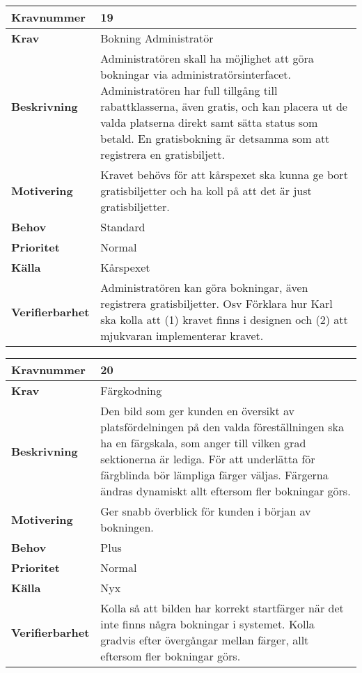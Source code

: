 \documentclass[a4paper, twoside, 11pt, titlepage]{article}
\begin{document}
\begin{tabular} { | p{3cm} | p{12.2cm} | }
	\hline
	\textbf{Kravnummer} & 19  \\
	\hline
	\textbf{Krav} & Bokning Administratör  \\
	\hline
	\textbf{Beskrivning} & Administratören skall ha möjlighet att göra bokningar via administratörsinterfacet. Administratören har full tillgång till rabattklasserna, även gratis, och kan placera ut de valda platserna direkt samt sätta status som betald. En gratisbokning är detsamma som att registrera en gratisbiljett.  \\
	\hline
	\textbf{Motivering} & Kravet behövs för att kårspexet ska kunna ge bort gratisbiljetter och ha koll på att det är just gratisbiljetter.  \\
	\hline
	\textbf{Behov} & Standard  \\
	\hline
	\textbf{Prioritet} & Normal  \\
	\hline
	\textbf{Källa} & Kårspexet  \\
	\hline
	\textbf{Verifierbarhet} & Administratören kan göra bokningar, även registrera gratisbiljetter. Osv Förklara hur Karl ska kolla att (1) kravet finns i designen och (2) att mjukvaran implementerar kravet.  \\
	\hline
\end{tabular}

\begin{tabular} { | p{3cm} | p{12.2cm} | }
	\hline
	\textbf{Kravnummer} & 20  \\
	\hline
	\textbf{Krav} & Färgkodning  \\
	\hline
	\textbf{Beskrivning} & Den bild som ger kunden en översikt av platsfördelningen på den valda föreställningen ska ha en färgskala, som anger till vilken grad sektionerna är lediga. För att underlätta för färgblinda bör lämpliga färger väljas. Färgerna ändras dynamiskt allt eftersom fler bokningar görs.  \\
	\hline
	\textbf{Motivering} & Ger snabb överblick för kunden i början av bokningen.  \\
	\hline
	\textbf{Behov} & Plus  \\
	\hline
	\textbf{Prioritet} & Normal  \\
	\hline
	\textbf{Källa} & Nyx  \\
	\hline
	\textbf{Verifierbarhet} & Kolla så att bilden har korrekt startfärger när det inte finns några bokningar i systemet. Kolla gradvis efter övergångar mellan färger, allt eftersom fler bokningar görs.   \\
	\hline
\end{tabular}
\end{document}
